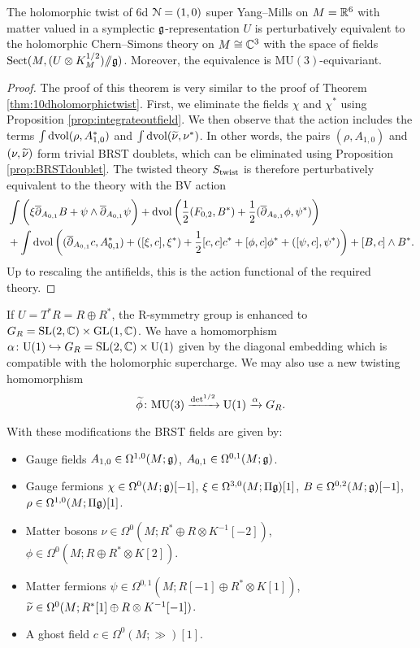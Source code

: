 \documentclass[10pt, oneside]{article}
\newcommand{\MU}{\mathrm{MU}}
\newcommand{\Sect}{\mathrm{Sect}}
\renewcommand{\U}{\mathrm{U}}
\newcommand{\ham}{/\!\!/}
\begin{document}
\begin{theorem}
The holomorphic twist of 6d $\mathcal N=(1, 0)$ super Yang--Mills on $M=\mathbb R^6$ with matter valued in a symplectic $\mathfrak g$-representation $U$ is perturbatively equivalent to the holomorphic Chern--Simons theory on $M\cong \mathbb C^3$ with the space of fields $\Sect(M, (U\otimes K_M^{1/2})\ham \fg)$. Moreover, the equivalence is $\MU(3)$-equivariant.
\label{thm:6dholomorphictwist}
\end{theorem}
\begin{proof}
The proof of this theorem is very similar to the proof of Theorem \ref{thm:10dholomorphictwist}. First, we eliminate the fields $\chi$ and $\chi^*$ using Proposition \ref{prop:integrateoutfield}.  We then observe that the action includes the terms $\int \operatorname{dvol}  (\rho, A_{1,0}^*)$ and $\int \operatorname{dvol} (\widetilde{\nu}, \nu^*)$.  In other words, the pairs $(\rho, A_{1,0})$ and $(\nu, \widetilde{\nu})$ form trivial BRST doublets, which can be eliminated using Proposition \ref{prop:BRSTdoublet}. The twisted theory $S_{\rm twist}$ is therefore perturbatively equivalent to the theory with the BV action 
\begin{align*}
& \int \bigg(\xi \overline{\partial}_{A_{0,1}} B  + \psi \wedge \overline{\partial}_{A_{0,1}} \psi \bigg) + \operatorname{dvol} \left(  \frac 12 (F_{0,2}, B^*) + \frac 12 (\overline{\partial}_{A_{0,1}} \phi, \psi^*)\right) \\
 &+ \int \operatorname{dvol}\left((\overline{\partial}_{A_{0, 1}} c, A_{0, 1}^*) + ([\xi, c], \xi^*) + \frac{1}{2}[c, c]c^* +  [\phi, c] \phi^* + ([\psi, c],\psi^*)\right) + [B, c] \wedge B^* .
\end{align*}
Up to rescaling the antifields, this is the action functional of the required theory.
\end{proof}

If $U=T^*R=R\oplus R^*$, the R-symmetry group is enhanced to $G_R=\mathrm{SL}(2, \mathbb C)\times \mathrm{GL}(1, \mathbb C)$. We have a homomorphism $\alpha\colon \U(1)\hookrightarrow G_R=\SL(2, \CC)\times \U(1)$ given by the diagonal embedding which is compatible with the holomorphic supercharge. We may also use a new twisting homomorphism
\[\Tilde{\phi}\colon\MU(3)\xrightarrow{\det^{1/2}}\U(1)\xrightarrow{\alpha} G_R.\]

With these modifications the BRST fields are given by:
\begin{itemize}
\item Gauge fields $A_{1, 0} \in \Omega^{1, 0}(M; \mathfrak g)$, $A_{0, 1}\in\Omega^{0, 1}(M; \mathfrak g)$.
\item Gauge fermions $\chi\in\Omega^0(M; \mathfrak g)[-1]$, $\xi\in\Omega^{3, 0}(M; \Pi\mathfrak g)[1]$, $B\in\Omega^{0, 2}(M; \mathfrak g)[-1]$, $\rho\in\Omega^{1, 0}(M; \Pi\mathfrak g)[1]$.
\item Matter bosons $\nu\in\Omega^0(M; R^*\oplus R\otimes K^{-1}[-2])$, $\phi\in\Omega^0(M; R\oplus R^*\otimes K[2])$.
\item Matter fermions $\psi\in \Omega^{0, 1}(M; R[-1]\oplus R^*\otimes K[1])$, $\widetilde{\nu}\in\Omega^0(M; R^*[1]\oplus R\otimes K^{-1}[-1])$.
\item A ghost field $c\in \Omega^0(M; \gg)[1]$.
\end{itemize}
\end{document}
